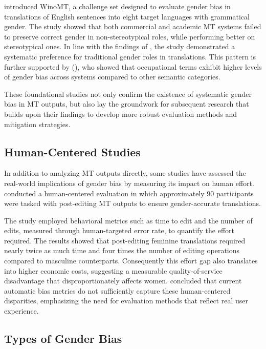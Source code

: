 \citet{stanovskyEvaluatingGenderBias2019} introduced WinoMT, a challenge set designed to evaluate gender bias in translations of English sentences into eight target languages with grammatical gender. The study showed that both commercial and academic MT systems failed to preserve correct gender in non-stereotypical roles, while performing better on stereotypical ones. In line with the findings of \citeauthor{pratesAssessingGenderBias2019}, the study demonstrated a systematic preference for traditional gender roles in translations. This pattern is further supported by \citeauthor{choMeasuringGenderBias2019} (\citeyear{choMeasuringGenderBias2019}), who showed that occupational terms exhibit higher levels of gender bias across systems compared to other semantic categories. 

These foundational studies not only confirm the existence of systematic gender bias in MT outputs, but also lay the groundwork for subsequent research that builds upon their findings to develop more robust evaluation methods and mitigation strategies.

\subsection{Human-Centered Studies}
In addition to analyzing MT outputs directly, some studies have assessed the real-world implications of gender bias by measuring its impact on human effort. \citet{savoldiWhatHarmQuantifying2024} conducted a human-centered evaluation in which approximately 90 participants were tasked with post-editing MT outputs to ensure gender-accurate translations.

The study employed behavioral metrics such as time to edit and the number of edits, measured through human-targeted error rate, to quantify the effort required. The results showed that post-editing feminine translations required nearly twice as much time and four times the number of editing operations compared to masculine counterparts. Consequently this effort gap also translates into higher economic costs, suggesting a measurable quality-of-service disadvantage that disproportionately affects women. \citeauthor{savoldiWhatHarmQuantifying2024} concluded that current automatic bias metrics do not sufficiently capture these human-centered disparities, emphasizing the need for evaluation methods that reflect real user experience.

\subsection{Types of Gender Bias}



